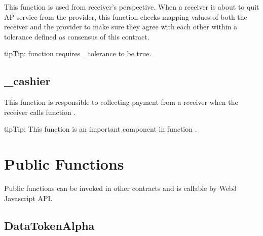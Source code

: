 \documentclass[letterpaper,10pt,english]{sphinxmanual}
\begin{document}
This function is used from receiver’s perspective. When a receiver is about to quit AP service from the provider,
this function checks mapping {\hyperref[\detokenize{index:usageof}]{}} values of both the receiver and the provider to make sure they agree with each other within a tolerance defined as consensus of this contract.

\begin{sphinxadmonition}{tip}{Tip:}
function {\hyperref[\detokenize{index:payandleave}]{}} requires \_tolerance to be true.
\end{sphinxadmonition}


\section{\_cashier}
\label{\detokenize{index:cashier}}
%
\begin{sphinxVerbatim}[commandchars=\\\{\}]
     
\end{sphinxVerbatim}

This function is responsible to collecting payment from a receiver when the receiver calls function {\hyperref[\detokenize{index:payandleave}]{}}.

\begin{sphinxadmonition}{tip}{Tip:}
This function is an important component in function {\hyperref[\detokenize{index:payandleave}]{}}.
\end{sphinxadmonition}


\chapter{Public Functions}
\label{\detokenize{index:public-functions}}
Public functions can be invoked in other contracts and is callable by Web3 Javascript API.


\section{DataTokenAlpha}
\label{\detokenize{index:datatokenalpha}}
%
\begin{sphinxVerbatim}[commandchars=\\\{\},numbers=left,firstnumber=1,stepnumber=1]
   
      
    \PYG{p}{[}\PYG{p}{]}  
\end{sphinxVerbatim}
\end{document}
